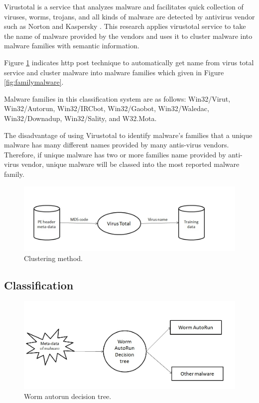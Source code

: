 Virustotal is a service that analyzes malware and facilitates quick collection of viruses, worms, trojans, and all kinds of malware are detected by antivirus vendor such as Norton and Kaspersky \cite{virustotal}. This research applies virustotal service to take the name of malware provided by the vendors and uses it to cluster malware into malware families with semantic information.

Figure \ref{fig:clustering} indicates http post technique to automatically get name from virus total service and cluster malware into malware families which given in Figure \ref{fig:familymalware}.

Malware families in this classification system are as follows: Win32/Virut, Win32/Autorun, Win32/IRCbot, Win32/Gaobot, Win32/Waledac, Win32/Downadup, Win32/Sality, and W32.Mota. 

The disadvantage of using Virustotal to identify malware's families that a unique malware has many different names provided by many antis-virus vendors. Therefore, if unique malware has two or more families name provided by anti-virus vendor, unique malware will be classed into the most reported malware family.
 
\begin{figure}[h!]
\centering
\includegraphics[width=1\textwidth]{graph/clustering.jpg}
\caption{Clustering method.}
\label{fig:clustering}
\end{figure}

\subsection{Classification}
\begin{figure}[h!]
\centering
\includegraphics[width=1\textwidth]{graph/classificationdecision.jpg}
\caption{Worm autorun decision tree.}
\label{fig:classificationdecision}
\end{figure}

